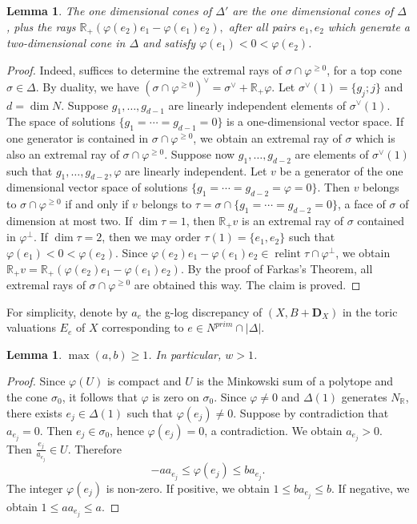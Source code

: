 \documentclass[12pt,twoside]{amsart}
\newcommand{\R}{{\mathbb R}}
\newcommand{\bD}{{\mathbf D}}
\newcommand{\relint}{\operatorname{relint}}
\theoremstyle{plain}
\newtheorem{lem}[thm]{Lemma}
\theoremstyle{definition}
\theoremstyle{remark}
\begin{document}
\begin{lem}\label{1r}
	The one dimensional cones of $\Delta'$ are the one dimensional cones of $\Delta$,
	plus the rays 
	$
	\R_+(\varphi(e_2) e_1-\varphi(e_1) e_2 ),
	$
	after all pairs $e_1,e_2$ which generate a two-dimensional cone in $\Delta$ and satisfy
	$ \varphi(e_1)<0< \varphi(e_2)$.
\end{lem}

\begin{proof}
	Indeed, suffices to determine the extremal rays of $\sigma\cap \varphi^{\ge 0}$, for 
	a top cone $\sigma\in \Delta$. By duality, we have $(\sigma\cap \varphi^{\ge 0})^\vee=
	\sigma^\vee+\R_+\varphi$. Let $\sigma^\vee(1)=\{g_j;j\}$ and $d=\dim N$.
	Suppose $g_1,\ldots,g_{d-1}$ are linearly independent elements of $\sigma^\vee(1)$.
	The space of solutions $\{g_1=\cdots=g_{d-1}=0\}$ is a one-dimensional vector space.
	If one generator is contained in $\sigma\cap \varphi^{\ge 0}$, we obtain an extremal ray of 
	$\sigma$ which is also an extremal ray of $\sigma\cap \varphi^{\ge 0}$.
	Suppose now $g_1,\ldots,g_{d-2}$ are elements of $\sigma^\vee(1)$ such that
	$g_1,\ldots,g_{d-2},\varphi$ are linearly independent. Let $v$ be a generator of the 
	one dimensional vector space of solutions $\{g_1=\cdots=g_{d-2}=\varphi=0\}$. 
	Then $v$ belongs to $\sigma\cap\varphi^{\ge 0}$ if and only if $v$ belongs to 
	$\tau=\sigma\cap\{g_1=\cdots=g_{d-2}=0\}$, a face of $\sigma$ of dimension at most two.
	If $\dim \tau=1$, then $\R_+ v$ is an extremal ray of $\sigma$ contained in $\varphi^\perp$.
	If $\dim \tau=2$, then we may order $\tau(1)=\{e_1,e_2\}$ such that 
	$\varphi(e_1)<0<\varphi(e_2)$.
	Since $\varphi(e_2) e_1-\varphi(e_1) e_2 \in \relint \tau\cap \varphi^\perp$,
	we obtain $\R_+v=\R_+( \varphi(e_2) e_1- \varphi(e_1) e_2 )$.
	By the proof of Farkas's Theorem, all extremal rays of $\sigma\cap \varphi^{\ge 0}$ are obtained this way.
	The claim is proved.
\end{proof}

For simplicity, denote by $a_e$ the g-log discrepancy
of $(X,B+\bD_X)$ in the toric valuations $E_e$ of $X$ corresponding to
$e\in N^{prim}\cap |\Delta|$. 

\begin{lem}\label{1w}
	$\max(a,b)\ge 1$. In particular, $w>1$.
\end{lem}
	
	\begin{proof}
		Since $\varphi(U)$ is compact and $U$ is the Minkowski sum of a 
		polytope and the cone $\sigma_0$, it follows that $\varphi$ is zero on $\sigma_0$.
		Since $\varphi\ne 0$ and $\Delta(1)$ generates $N_\R$, there exists 
		$e_j\in \Delta(1)$ such that $\varphi(e_j)\ne 0$. Suppose by contradiction that 
		$a_{e_j}=0$. Then $e_j\in \sigma_0$, hence $\varphi(e_j)=0$, a contradiction.
		We obtain $a_{e_j}>0$. Then $\frac{e_j}{a_{e_j}}\in U$. Therefore 
		$$
		-aa_{e_j}\le \varphi (e_j)\le ba_{e_j}.
		$$
		The integer $\varphi(e_j)$ is non-zero. If positive, we obtain $1\le ba_{e_j}\le b$.
		If negative, we obtain $1\le aa_{e_j}\le a$. 
	\end{proof}
	
\end{document}
